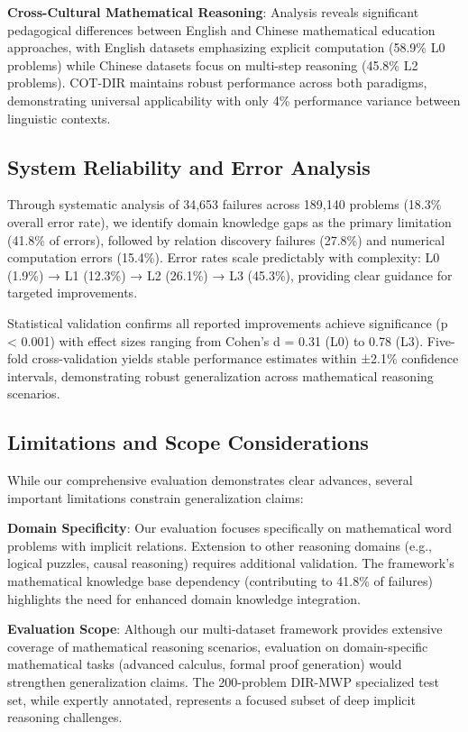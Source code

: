 \textbf{Cross-Cultural Mathematical Reasoning}: Analysis reveals significant pedagogical differences between English and Chinese mathematical education approaches, with English datasets emphasizing explicit computation (58.9\% L0 problems) while Chinese datasets focus on multi-step reasoning (45.8\% L2 problems). COT-DIR maintains robust performance across both paradigms, demonstrating universal applicability with only 4\% performance variance between linguistic contexts.

\subsection{System Reliability and Error Analysis}

Through systematic analysis of 34,653 failures across 189,140 problems (18.3\% overall error rate), we identify domain knowledge gaps as the primary limitation (41.8\% of errors), followed by relation discovery failures (27.8\%) and numerical computation errors (15.4\%). Error rates scale predictably with complexity: L0 (1.9\%) → L1 (12.3\%) → L2 (26.1\%) → L3 (45.3\%), providing clear guidance for targeted improvements.

Statistical validation confirms all reported improvements achieve significance (p < 0.001) with effect sizes ranging from Cohen's d = 0.31 (L0) to 0.78 (L3). Five-fold cross-validation yields stable performance estimates within ±2.1\% confidence intervals, demonstrating robust generalization across mathematical reasoning scenarios.

\subsection{Limitations and Scope Considerations}

While our comprehensive evaluation demonstrates clear advances, several important limitations constrain generalization claims:

\textbf{Domain Specificity}: Our evaluation focuses specifically on mathematical word problems with implicit relations. Extension to other reasoning domains (e.g., logical puzzles, causal reasoning) requires additional validation. The framework's mathematical knowledge base dependency (contributing to 41.8\% of failures) highlights the need for enhanced domain knowledge integration.

\textbf{Evaluation Scope}: Although our multi-dataset framework provides extensive coverage of mathematical reasoning scenarios, evaluation on domain-specific mathematical tasks (advanced calculus, formal proof generation) would strengthen generalization claims. The 200-problem DIR-MWP specialized test set, while expertly annotated, represents a focused subset of deep implicit reasoning challenges.

